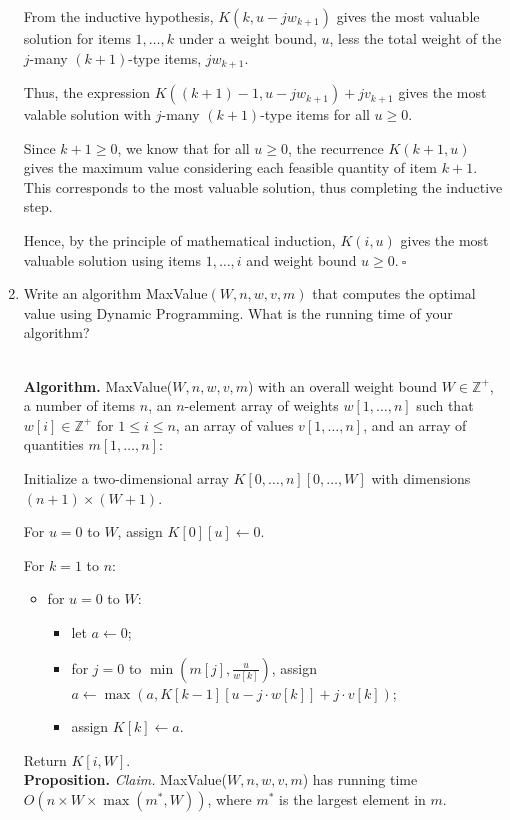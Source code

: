 \begin{enumerate}
\begin{solution}
From the inductive hypothesis, $K(k,u-jw_{k+1})$ gives the most valuable solution for items $1,\dots,k$ under a weight bound, $u$, less the total weight of the $j$-many $(k+1)$-type items, $jw_{k+1}$.

Thus, the expression $K((k+1)-1,u-jw_{k+1})+jv_{k+1}$ gives the most valable solution with $j$-many $(k+1)$-type items for all $u\geq 0$.

Since $k+1\geq 0$, we know that for all $u\geq 0$, the recurrence $K(k+1,u)$ gives the maximum value considering each feasible quantity of item $k+1$. This corresponds to the most valuable solution, thus completing the inductive step.

Hence, by the principle of mathematical induction, $K(i,u)$ gives the most valuable solution using items $1,\dots,i$ and weight bound $u\geq 0$.$~\square$
\end{solution}
\item Write an algorithm {\sc MaxValue}$(W,n,w,v,m)$ that computes the optimal value using Dynamic Programming. What is the running time of your algorithm?
\begin{solution}\\

\textbf{Algorithm. }{\sc MaxValue}($W,n,w,v,m$) with an overall weight bound $W\in\mathbb{Z}^+$, a number of items $n$, an $n$-element array of weights $w[1,\dots,n]$ such that $w[i]\in\mathbb{Z}^+$ for $1\leq i\leq n$, an array of values $v[1,\dots,n]$, and an array of quantities $m[1,\dots,n]$:

Initialize a two-dimensional array $K[0,\dots,n][0,\dots,W]$ with dimensions $(n+1)\times(W+1)$.

For $u=0$ to $W$, assign $K[0][u]\leftarrow 0$.

For $k=1$ to $n$:
\begin{itemize}
\item for $u=0$ to $W$:
\begin{itemize}
\item let $a\leftarrow 0$;
\item for $j=0$ to $\min\left(m[j],\frac{u}{w[k]}\right)$, assign $a\leftarrow\max(a,K[k-1][u-j\cdot w[k]]+j\cdot v[k])$;
\item assign $K[k]\leftarrow a$.
\end{itemize}
\end{itemize}
Return $K[i,W]$.\\

\textbf{Proposition. }\textit{Claim. }{\sc MaxValue}($W,n,w,v,m$) has running time $O(n\times W\times\max(m^*,W))$, where $m^*$ is the largest element in $m$.


\end{solution}
\end{enumerate}
